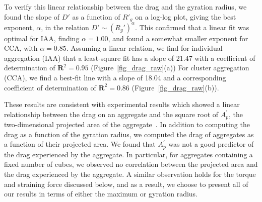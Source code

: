 To verify this linear relationship between the drag and the gyration radius, we found the slope of $D'$ as a function of $R'_g$ on a log-log plot, giving the best exponent, $\alpha$, in the relation $D' \sim (R_g')^\alpha$. This confirmed that a linear fit was optimal for IAA, finding $\alpha=1.00$, and found a somewhat smaller exponent for CCA, with $\alpha=0.85$. Assuming a linear relation, we find
for individual aggregation (IAA) that a least-square fit has a slope of 21.47 with  a coefficient of determination of $\mathbf{R}^2=0.95$ (Figure~\ref{fig_drag_raw}(a)) 
For cluster aggregation (CCA), we find a best-fit line with a slope of 18.04 and a corresponding coefficient of determination of $\mathbf{R}^2=0.86$ (Figure~\ref{fig_drag_raw}(b)). 



These results are consistent with experimental results which showed a linear relationship between the drag on an aggregate and the square root of $A^\prime_p$, the two-dimensional projected area of the aggregate~\cite{tang_model_2002}.  In addition to computing the drag as a function of the gyration radius, we computed the drag of aggregates as a function of their projected area. We found that $A^\prime_p$ was not a good predictor of the drag experienced by the aggregate. In particular, for aggregates containing a fixed number of cubes, we observed no correlation between the projected area and the drag experienced by the aggregate. A similar observation holds for the torque and straining force discussed below, and as a result, we choose to present all of our results in terms of either the maximum or gyration radius.

